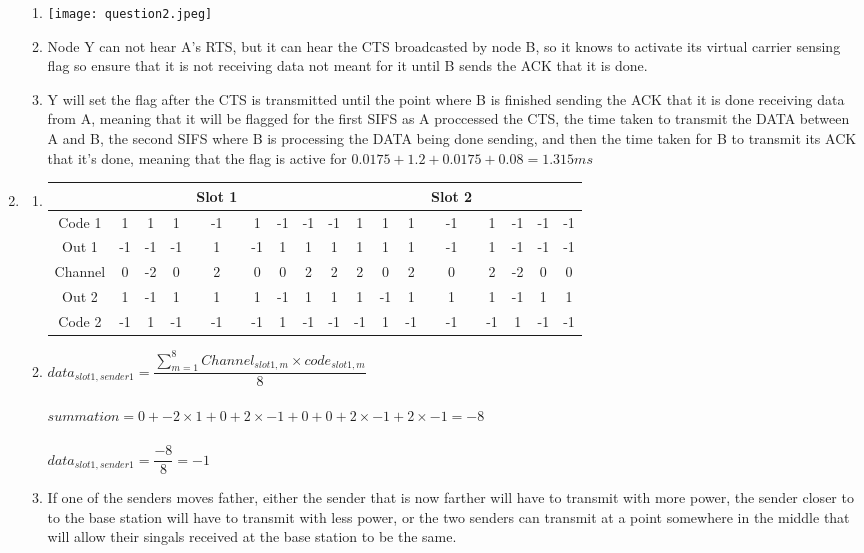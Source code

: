 \documentclass[12pt]{article}
\begin{document}
\begin{enumerate}
\begin{enumerate}
			\item \texttt{[image: question2.jpeg]}\\
			\item Node Y can not hear A's RTS, but it can hear the CTS broadcasted by node B, so it knows to activate its virtual carrier sensing flag so ensure that it is not receiving data not meant for it until B sends the ACK that it is done.
			\item Y will set the flag after the CTS is transmitted until the point where B is finished sending the ACK that it is done receiving data from A, meaning that it will be flagged for the first SIFS as A proccessed the CTS, the time taken to transmit the DATA between A and B, the second SIFS where B is processing the DATA being done sending, and then the time taken for B to transmit its ACK that it's done, meaning that the flag is active for $0.0175 + 1.2 + 0.0175 + 0.08 = 1.315ms$

		\end{enumerate}

	\item \begin{enumerate}

			\footnotesize

			\item \begin{tabular}{c|c c c c c c c c|c c c c c c c c}
			&&&&Slot 1&&&&&&&&Slot 2\\
			\hline
			Code 1  & 1 & 1 & 1 &-1 & 1 &-1 &-1 &-1 & 1 & 1 & 1 &-1 & 1 &-1 &-1 &-1\\
			Out 1   &-1 &-1 &-1 & 1 &-1 & 1 & 1 & 1 & 1 & 1 & 1 &-1 & 1 &-1 &-1 &-1\\
			Channel & 0 &-2 & 0 & 2 & 0 & 0 & 2 & 2 & 2 & 0 & 2 & 0 & 2 &-2 & 0 & 0\\
			Out 2   & 1 &-1 & 1 & 1 & 1 &-1 & 1 & 1 & 1 &-1 & 1 & 1 & 1 &-1 & 1 & 1\\
			Code 2  &-1 & 1 &-1 &-1 &-1 & 1 &-1 &-1 &-1 & 1 &-1 &-1 &-1 & 1 &-1 &-1\\
			\end{tabular}

			\normalsize

			\item $data_{slot1, sender1} = \dfrac{\displaystyle \sum_{m = 1}^{8} Channel_{slot1,m} \times code_{slot1,m}}{8}$\\
			\\
			$summation = 0 + -2\times1 + 0 + 2\times-1 + 0 + 0 + 2\times-1 + 2\times-1 = -8$\\
			\\
			$data_{slot1, sender1} = \dfrac{-8}{8} = -1$
			\item If one of the senders moves father, either the sender that is now farther will have to transmit with more power, the sender closer to to the base station will have to transmit with less power, or the two senders can transmit at a point somewhere in the middle that will allow their singals received at the base station to be the same.



\end{enumerate}
\end{enumerate}
\end{document}
